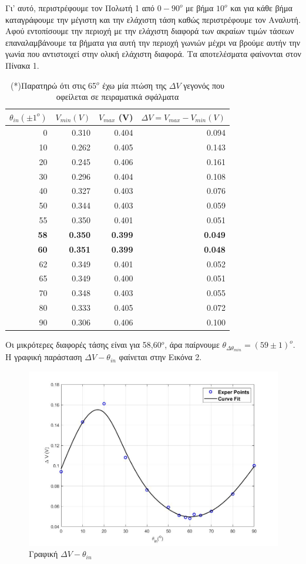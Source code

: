 \documentclass[a4paper]{article}
\begin{document}
	Γι' αυτό, περιστρέφουμε τον Πολωτή 1 από $0-90^o$ με βήμα $10^o$ και για κάθε βήμα καταγράφουμε την μέγιστη και την ελάχιστη τάση καθώς περιστρέφουμε τον Αναλυτή. Αφού εντοπίσουμε την περιοχή με την ελάχιστη διαφορά των ακραίων τιμών τάσεων επαναλαμβάνουμε τα βήματα για αυτή την περιοχή γωνιών μέχρι να βρούμε αυτήν την γωνία που αντιστοιχεί στην ολική ελάχιστη διαφορά. 
	Τα αποτελέσματα φαίνονται στον Πίνακα 1.
	
	\begin{table}[h!]
		\centering
		\begin{tabular}{r|r|r|r}
		$\theta_{in}(\pm1^o)$ & $V_{min} (V)$ & $V_{max}$ (V)& $\Delta V = V_{max}-V_{min}(V)$\\ 
		\hline\hline
			0&0.310 &0.404 & 0.094\\
			10&0.262&0.405 & 0.143\\
			20&0.245&0.406 & 0.161\\
			30&0.296&0.404 & 0.108\\
			40&0.327&0.403 & 0.076\\
			50&0.344&0.403 & 0.059\\
			55&0.350&0.401 & 0.051\\
			\textbf{58}&\textbf{0.350}&\textbf{0.399} & \textbf{0.049}\\
			\textbf{60}&\textbf{0.351}&\textbf{0.399} & \textbf{0.048}\\
			62&0.349&0.401 & 0.052\\
			65&0.349&0.400 & 0.051\\
			70&0.348&0.403 & 0.055\\
			80&0.333&0.405 & 0.072\\
			90&0.306&0.406 & 0.100
		\end{tabular}		 
		\caption{(*)Παρατηρώ ότι στις 65$^o$ έχω μία πτώση της $\Delta V$ γεγονός που οφείλεται σε πειραματικά σφάλματα }
	\end{table}
	Οι μικρότερες διαφορές τάσης είναι για 58,60$^o$, άρα παίρνουμε $\theta_{\Delta\theta_{min}} = (59\pm1)^o$.
	Η γραφική παράσταση $\Delta V - \theta_{in}$  φαίνεται στην Εικόνα 2.
	\begin{figure}[h!]
		\centering
		\includegraphics[scale=0.42]{plot1.jpg}
		\caption{Γραφική $\Delta V - \theta_{in}$}
	\end{figure}
	
\end{document}
